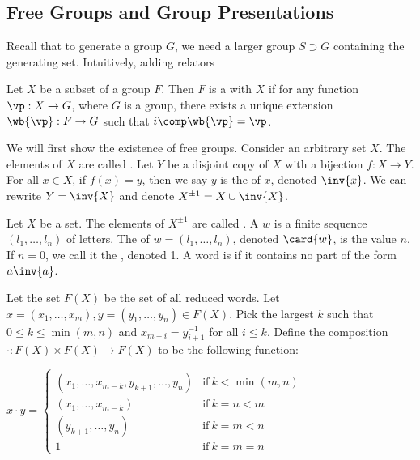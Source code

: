 \documentclass[10pt]{article}
\begin{document}
\subsection{Free Groups and Group Presentations}
\par
Recall that to generate a group $G$, we need a larger group $S\supset G$ containing the generating set. Intuitively, adding relators 
\begin{definition}
    Let $X$ be a subset of a group $F$. Then $F$ is a  with  $X$ if for any function $\vp:X\to G$, where $G$ is a group, there exists a unique extension $\wb{\vp}:F\to G$ such that $i\comp\wb{\vp}=\vp$.
\end{definition}
\begin{center}
\end{center}
\par
We will first show the existence of free groups. Consider an arbitrary set $X$. The elements of $X$ are called . Let $Y$ be a disjoint copy of $X$ with a bijection $f:X\to Y$. For all $x\in X$, if $f(x)=y$, then we say $y$ is the  of $x$, denoted $\inv{x}$. We can rewrite $Y=\inv{X}$ and denote ${X}^{\pm 1}=X\cup\inv{X}$.
\begin{definition}
    Let $X$ be a set. The elements of ${X}^{\pm 1}$ are called . A  $w$ is a finite sequence $({l}_{1},\dots,{l}_{n})$ of letters. The  of $w=({l}_{1},\dots,{l}_{n})$, denoted $\card{w}$, is the value $n$. If $n=0$, we call it the , denoted 1. A word is  if it contains no part of the form $a\inv{a}$.
\end{definition}
\par
Let the set $F(X)$ be the set of all reduced words. Let $x=({x}_{1},\dots,{x}_{m}),y=({y}_{1},\dots,{y}_{n})\in F(X)$. Pick the largest $k$ such that $0\le k\le\min(m,n)$ and ${x}_{m-i}={y}_{i+1}^{-1}$ for all $i\le k$. Define the composition $\cdot:F(X)\times F(X)\to F(X)$ to be the following function:
\begin{center}
    $x\cdot y=\begin{cases}
        ({x}_{1},\dots,{x}_{m-k},{y}_{k+1},\dots,{y}_{n}) & \text{if}\ k<\min(m,n) \\
        ({x}_{1},\dots,{x}_{m-k}) & \text{if}\ k=n<m \\
        ({y}_{k+1},\dots,{y}_{n}) & \text{if}\ k=m<n \\
        1 & \text{if}\ k=m=n
    \end{cases}$
\end{center}
\end{document}
